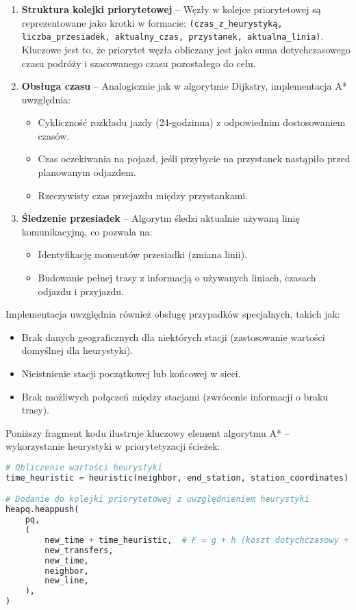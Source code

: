 \documentclass[12pt,a4paper]{article}
\begin{document}
\begin{enumerate}
    \item \textbf{Struktura kolejki priorytetowej} -- Węzły w kolejce priorytetowej są reprezentowane jako krotki w formacie: \texttt{(czas\_z\_heurystyką, liczba\_przesiadek, aktualny\_czas, przystanek, aktualna\_linia)}. Kluczowe jest to, że priorytet węzła obliczany jest jako suma dotychczasowego czasu podróży i szacowanego czasu pozostałego do celu.
    
    \item \textbf{Obsługa czasu} -- Analogicznie jak w algorytmie Dijkstry, implementacja A* uwzględnia:
    \begin{itemize}
        \item Cykliczność rozkładu jazdy (24-godzinna) z odpowiednim dostosowaniem czasów.
        \item Czas oczekiwania na pojazd, jeśli przybycie na przystanek nastąpiło przed planowanym odjazdem.
        \item Rzeczywisty czas przejazdu między przystankami.
    \end{itemize}
    
    \item \textbf{Śledzenie przesiadek} -- Algorytm śledzi aktualnie używaną linię komunikacyjną, co pozwala na:
    \begin{itemize}
        \item Identyfikację momentów przesiadki (zmiana linii).
        \item Budowanie pełnej trasy z informacją o używanych liniach, czasach odjazdu i przyjazdu.
    \end{itemize}
\end{enumerate}

Implementacja uwzględnia również obsługę przypadków specjalnych, takich jak:
\begin{itemize}
    \item Brak danych geograficznych dla niektórych stacji (zastosowanie wartości domyślnej dla heurystyki).
    \item Nieistnienie stacji początkowej lub końcowej w sieci.
    \item Brak możliwych połączeń między stacjami (zwrócenie informacji o braku trasy).
\end{itemize}

Poniższy fragment kodu ilustruje kluczowy element algorytmu A* -- wykorzystanie heurystyki w priorytetyzacji ścieżek:

\begin{lstlisting}[language=Python]
# Obliczenie wartości heurystyki
time_heuristic = heuristic(neighbor, end_station, station_coordinates)

# Dodanie do kolejki priorytetowej z uwzględnieniem heurystyki
heapq.heappush(
    pq,
    (
        new_time + time_heuristic,  # F = g + h (koszt dotychczasowy + heurystyka)
        new_transfers,
        new_time,
        neighbor,
        new_line,
    ),
)
\end{lstlisting}
\end{document}
